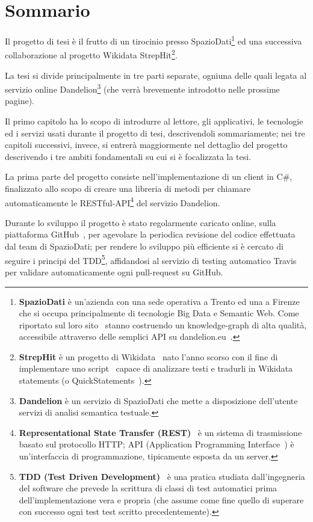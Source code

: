 \chapter*{Sommario} %
\label{sommario}

Il progetto di tesi è il frutto di un tirocinio presso SpazioDati\footnote{
    \textbf{SpazioDati} è un'azienda con una sede operativa a Trento ed una a Firenze che si occupa principalmente di tecnologie Big Data e Semantic Web.
    Come riportato sul loro sito~\cite{spaziodati} stanno costruendo un knowledge-graph di alta qualità, accessibile attraverso delle semplici API 
    su dandelion.eu~\cite{dandelion}.
}
ed una successiva collaborazione al progetto Wikidata StrepHit\footnote{
    \textbf{StrepHit} è un progetto di Wikidata~\cite{wikidata} nato l'anno scorso con il fine di implementare uno script~\cite{strephit} 
    capace di analizzare testi e tradurli in Wikidata statements (o QuickStatements~\cite{quickstatements}). 
}. 

La tesi si divide principalmente in tre parti separate, ogniuna delle quali legata al servizio online Dandelion\footnote{
    \textbf{Dandelion} è un servizio di SpazioDati che mette a disposizione dell'utente servizi di analisi semantica testuale.
} (che verrà brevemente introdotto nelle prossime pagine). 

Il primo capitolo ha lo scopo di introdurre al lettore, gli applicativi, le tecnologie ed i servizi usati durante il progetto di tesi, descrivendoli sommariamente; 
nei tre capitoli successivi, invece, si entrerà maggiormente nel dettaglio del progetto descrivendo i tre ambiti fondamentali su cui si è focalizzata la tesi.

La prima parte del progetto consiste nell'implementazione di un client in C$\#$, finalizzato allo scopo di creare una libreria di metodi  
per chiamare automaticamente le RESTful-API\footnote{
    \textbf{Representational State Transfer (REST)}~\cite{rest} è un sistema di trasmissione basato sul protocollo HTTP; API (Application Programming Interface~\cite{api}) è
    un'interfaccia di programmazione, tipicamente esposta da un server.
} del servizio Dandelion. 

Durante lo sviluppo il progetto è stato regolarmente caricato online, sulla piattaforma GitHub~\cite{github}, per agevolare la periodica revisione del codice effettuata dal team di SpazioDati; 
per rendere lo sviluppo più efficiente si è cercato di seguire i principi del TDD\footnote{
        \textbf{TDD (Test Driven Development)}~\cite{tdd} è una pratica studiata dall'ingegneria del software che prevede la 
        scrittura di classi di test automatici prima dell'implementazione vera e propria (che assume come fine 
        quello di superare con successo ogni test test scritto precedentemente).    
}, affidandosi al servizio di testing automatico Travis~\cite{travis} per validare automaticamente ogni pull-request su GitHub. 

